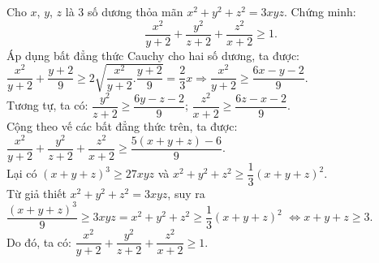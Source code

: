 \begin{ex}%
    Cho $x$, $y$, $z$ là $3$ số dương thỏa mãn $x^2+y^2+z^2=3xyz$. Chứng minh: $$\dfrac{x^2}{y+2}+\dfrac{y^2}{z+2}+\dfrac{z^2}{x+2} \geq 1.$$
\loigiai
    {
    Áp dụng bất đẳng thức Cauchy cho hai số dương, ta được:\\
    \hspace*{1cm} $\dfrac{x^2}{y+2}+\dfrac{y+2}{9} \geq 2\sqrt{\dfrac{x^2}{y+2}.\dfrac{y+2}{9}}=\dfrac{2}{3}x \Rightarrow \dfrac{x^2}{y+2} \geq \dfrac{6x-y-2}{9}$.\\
    Tương tự, ta có: $\dfrac{y^2}{z+2} \geq \dfrac{6y-z-2}{9}$; $\dfrac{z^2}{x+2} \geq \dfrac{6z-x-2}{9}$.\\
    Cộng theo vế các bất đẳng thức trên, ta được: $\dfrac{x^2}{y+2}+\dfrac{y^2}{z+2}+\dfrac{z^2}{x+2} \geq \dfrac{5(x+y+z)-6}{9}$.\\
    Lại có $(x+y+z)^3 \geq 27xyz$ và $x^2+y^2+z^2 \geq \dfrac{1}{3}(x+y+z)^2$.\\
    Từ giả thiết $x^2+y^2+z^2=3xyz$, suy ra $\dfrac{(x+y+z)^3}{9} \geq 3xyz = x^2+y^2+z^2 \geq \dfrac{1}{3}(x+y+z)^2$ $\Leftrightarrow x+y+z \geq 3$.\\
    Do đó, ta có: $\dfrac{x^2}{y+2}+\dfrac{y^2}{z+2}+\dfrac{z^2}{x+2} \geq 1$.
    }
\end{ex}

